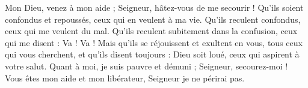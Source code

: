 {Mon Dieu, venez à mon aide ; Seigneur, hâtez-vous de me secourir !}
{Qu'ils soient confondus et repoussés, ceux qui en veulent à ma vie.}
{Qu'ils reculent confondus, ceux qui me veulent du mal.}
{Qu'ils reculent subitement dans la confusion, ceux qui me disent : Va ! Va !}
{Mais qu'ils se réjouissent et exultent en vous, tous ceux qui vous cherchent, et qu'ils disent toujours : \og Dieu soit loué\fg, ceux qui aspirent à votre salut.}
{Quant à moi, je suis pauvre et démuni ; Seigneur, secourez-moi !}
{Vous êtes mon aide et mon libérateur, Seigneur je ne périrai pas.}